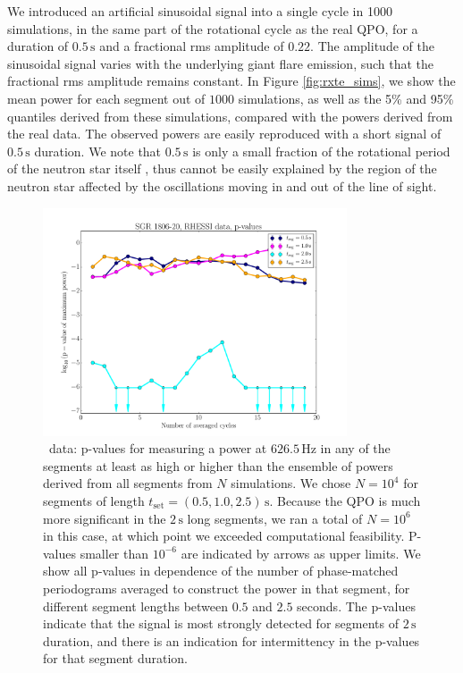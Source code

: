\documentclass{emulateapj}
\begin{document}
We introduced an artificial sinusoidal signal into a single cycle in 1000 simulations, in the same part of the rotational cycle as the real QPO, for a duration of $0.5\, \mathrm{s}$ and a fractional rms amplitude of $0.22$. The amplitude of the sinusoidal signal varies with the underlying giant flare emission, such that the fractional rms amplitude remains constant. In Figure \ref{fig:rxte_sims}, we show the mean power for each segment out of $1000$ simulations, as well as the 5\% and 95\% quantiles derived from these simulations, compared with the powers derived from the real data. The observed powers are easily reproduced with a short signal of $0.5\, \mathrm{s}$ duration. We note that $0.5\,\mathrm{s}$ is only a small fraction of the rotational period of the neutron star itself \citep[$7.5477 \,\mathrm{s}$,][]{Woods07}, thus cannot be easily explained by the region of the neutron star affected by the oscillations moving in and out of the line of sight.
\begin{figure}[htbp]
\begin{center}
\includegraphics[width=9cm]{f7.pdf}
\caption{\rhessi\ data: p-values for measuring a power at $626.5\, \mathrm{Hz}$ in any of the segments at least as high or higher than the ensemble of powers derived from all segments from $N$ simulations. We chose $N=10^{4}$ for segments of length $t_{\mathrm{set}} = (0.5, 1.0, 2.5) \,\mathrm{s}$. Because the QPO is much more significant in the $2\,\mathrm{s}$ long segments, we ran a total of $N=10^{6}$ in this case, at which point we exceeded computational feasibility. P-values smaller than $10^{-6}$ are indicated by arrows as upper limits. We show all p-values in dependence of the number of phase-matched periodograms averaged to construct the power in that segment, for different segment lengths between $0.5$ and $2.5$ seconds. The p-values indicate that the signal is most strongly detected for segments of $2\,\mathrm{s}$ duration, and there is an indication for intermittency in the p-values for that segment duration.}
\label{fig:rhessi_pvalues}
\end{center}
\end{figure}
\end{document}
